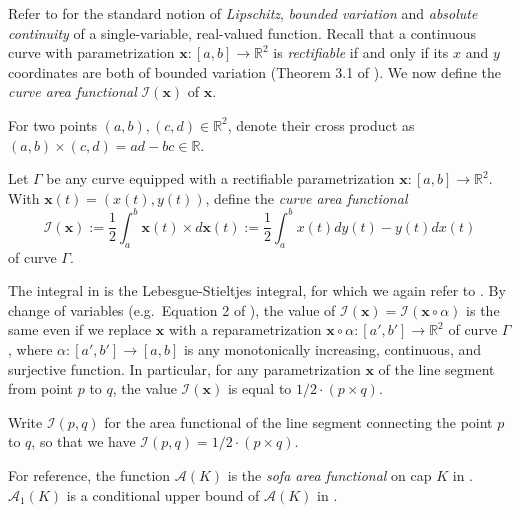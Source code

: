 Refer to \autocite{steinRealAnalysisMeasure2005} for the standard notion of \emph{Lipschitz}, \emph{bounded variation} and \emph{absolute continuity} of a single-variable, real-valued function. Recall that a continuous curve with parametrization \(\mathbf{x} : [a, b] \to \mathbb{R}^2\) is \emph{rectifiable} if and only if its \(x\) and \(y\) coordinates are both of bounded variation (Theorem 3.1 of \autocite{steinRealAnalysisMeasure2005}). We now define the \emph{curve area functional} \(\mathcal{I}(\mathbf{x})\) of \(\mathbf{x}\).

\begin{definition}

For two points \((a, b), (c, d) \in \mathbb{R}^2\), denote their cross product as \((a, b) \times (c, d) = ad - bc \in \mathbb{R}\).

\label{def:planar-cross-product}
\end{definition}

\begin{definition}

Let \(\Gamma\) be any curve equipped with a rectifiable parametrization \(\mathbf{x} : [a, b] \to \mathbb{R}^2\). With \(\mathbf{x}(t) = (x(t), y(t))\), define the \emph{curve area functional}
\[
\mathcal{I}(\mathbf{x}) := \frac{1}{2} \int_a^b \mathbf{x}(t) \times d\mathbf{x}(t) := \frac{1}{2} \int_a^b x(t) dy(t) - y(t) dx(t)
\]
of curve \(\Gamma\).

\label{def:curve-area-functional}
\end{definition}

The integral in  is the Lebesgue-Stieltjes integral, for which we again refer to \autocite{steinRealAnalysisMeasure2005}. By change of variables (e.g.~Equation 2 of \autocite{falknerSubstitutionRuleLebesgue2012}), the value of \(\mathcal{I}(\mathbf{x}) = \mathcal{I}(\mathbf{x} \circ \alpha)\) is the same even if we replace \(\mathbf{x}\) with a reparametrization \(\mathbf{x} \circ \alpha : [a', b'] \to \mathbb{R}^2\) of curve \(\Gamma\), where \(\alpha : [a', b'] \to [a, b]\) is any monotonically increasing, continuous, and surjective function. In particular, for any parametrization \(\mathbf{x}\) of the line segment from point \(p\) to \(q\), the value \(\mathcal{I}(\mathbf{x})\) is equal to \(1/2 \cdot (p \times q)\).

\begin{definition}

Write \(\mathcal{I}(p, q)\) for the area functional of the line segment connecting the point \(p\) to \(q\), so that we have \(\mathcal{I}(p, q) = 1/2 \cdot (p \times q)\).

\label{def:curve-area-functional-segment}
\end{definition}

For reference, the function \(\mathcal{A}(K)\) is the \emph{sofa area functional} on cap \(K\) in . \(\mathcal{A}_1(K)\) is a conditional upper bound of \(\mathcal{A}(K)\) in .
